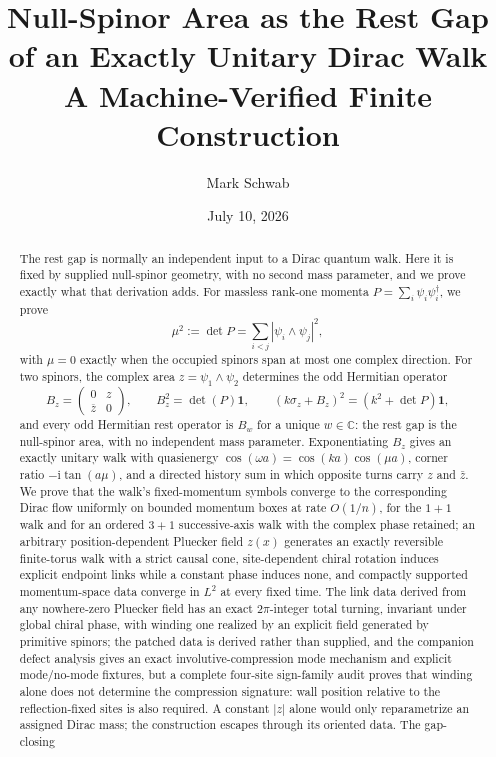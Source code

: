 \documentclass[11pt]{article}
\title{Null-Spinor Area as the Rest Gap of an Exactly Unitary Dirac Walk\\
\large A Machine-Verified Finite Construction}
\author{Mark Schwab}
\date{July 10, 2026}
\newcommand{\ii}{\mathrm{i}}
\newcommand{\C}{\mathbb{C}}
\newcommand{\id}{\mathbf{1}}
\begin{document}
\maketitle

\begin{abstract}
The rest gap is normally an independent input to a Dirac quantum walk.  Here
it is fixed by supplied null-spinor geometry, with no second mass parameter,
and we prove exactly what that derivation adds.  For
massless rank-one momenta $P=\sum_i\psi_i\psi_i^\dagger$, we prove
\[
  \mu^2:=\det P
  =\sum_{i<j}|\psi_i\wedge\psi_j|^2,
\]
with $\mu=0$ exactly when the occupied spinors span at most one complex
direction.  For two
spinors, the complex area $z=\psi_1\wedge\psi_2$ determines the odd Hermitian
operator
\[
  B_z=\begin{pmatrix}0&z\\ \overline z&0\end{pmatrix},
  \qquad B_z^2=\det(P)\id,
  \qquad (k\sigma_z+B_z)^2=(k^2+\det P)\id,
\]
and every odd Hermitian rest operator is $B_w$ for a unique $w\in\C$: the rest
gap is the null-spinor area, with no independent mass parameter.
Exponentiating $B_z$ gives an exactly unitary walk with quasienergy
$\cos(\omega a)=\cos(ka)\cos(\mu a)$, corner ratio $-\ii\tan(a\mu)$, and a
directed history sum in which opposite turns carry $z$ and $\bar z$.  We prove
that the walk's fixed-momentum symbols converge to the corresponding Dirac
flow uniformly on bounded momentum boxes at rate $O(1/n)$, for the $1+1$
walk and for an ordered $3+1$ successive-axis walk with the complex phase
retained; an arbitrary position-dependent Pluecker field $z(x)$ generates an
exactly reversible finite-torus walk with a strict causal cone, site-dependent
chiral rotation induces explicit endpoint links while a constant phase induces
none, and compactly supported momentum-space data converge in $L^2$ at every
fixed time.  The link data derived from any nowhere-zero Pluecker field has
an exact $2\pi$-integer total turning, invariant under global chiral phase,
with winding one realized by an explicit field generated by primitive
spinors; the patched data is derived rather than supplied, and the
companion defect analysis gives an exact involutive-compression mode mechanism
and explicit mode/no-mode fixtures, but a complete four-site sign-family audit
proves that winding alone does not determine the compression signature: wall
position relative to the reflection-fixed sites is also required.  A constant
$|z|$ alone would only reparametrize an assigned Dirac
mass; the construction escapes through its oriented data.  The gap-closing

\end{abstract}
\end{document}
